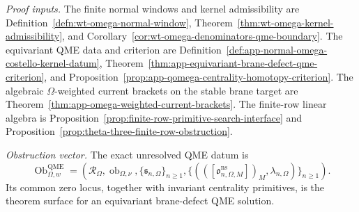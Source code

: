 \begin{stmt}
  \emph{Proof inputs.}
  The finite normal windows and kernel admissibility are
  Definition~\ref{defn:wt-omega-normal-window},
  Theorem~\ref{thm:wt-omega-kernel-admissibility}, and
  Corollary~\ref{cor:wt-omega-denominators-qme-boundary}.  The
  equivariant QME data and criterion are
  Definition~\ref{def:app-normal-omega-costello-kernel-datum},
  Theorem~\ref{thm:app-equivariant-brane-defect-qme-criterion}, and
  Proposition~\ref{prop:app-qomega-centrality-homotopy-criterion}.  The
  algebraic \(\Omega\)-weighted current brackets on the stable brane
  target are Theorem~\ref{thm:app-omega-weighted-current-brackets}.  The
  finite-row linear algebra is
  Proposition~\ref{prop:finite-row-primitive-search-interface} and
  Proposition~\ref{prop:theta-three-finite-row-obstruction}.

  \emph{Obstruction vector.} The exact unresolved QME datum is
  \[
    \operatorname{Ob}^{\mathrm{QME}}_{\Omega,w}
    =
    \left(
      \mathcal R_{\Omega},
      \operatorname{ob}_{\Omega,\nu},
      \{\mathfrak s_{n,\Omega}\}_{n\ge1},
      \{(([\mathfrak o^{\mathrm{ns}}_{n,\Omega,M}])_M,
        \lambda_{n,\Omega})\}_{n\ge1}
    \right).
  \]
  Its common zero locus, together with invariant centrality primitives,
  is the theorem surface for an equivariant brane-defect QME solution.
\end{stmt}

